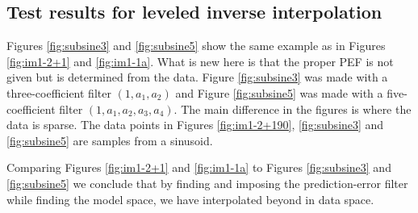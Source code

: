 \subsection{Test results for leveled inverse interpolation }
Figures \ref{fig:subsine3} and \ref{fig:subsine5}
show the same example as in Figures
\ref{fig:im1-2+1} and
\ref{fig:im1-1a}.
What is new here is that the proper PEF
is not given but is determined from the data.
Figure \ref{fig:subsine3} was made with a three-coefficient filter $(1,a_1,a_2)$ and
Figure \ref{fig:subsine5} was made with a five-coefficient filter
$(1,a_1,a_2,a_3,a_4)$.
The main difference in the figures is where the data is sparse.
The data points in Figures
\ref{fig:im1-2+190},
\ref{fig:subsine3} and
\ref{fig:subsine5} are samples from a sinusoid.
\par
        Comparing Figures
        \ref{fig:im1-2+1} and
        \ref{fig:im1-1a} to
        Figures \ref{fig:subsine3} and \ref{fig:subsine5}
        we conclude that by finding and imposing
        the prediction-error filter
        while finding the model space,
        we have interpolated beyond  in data space.
\par
{}
%
%
